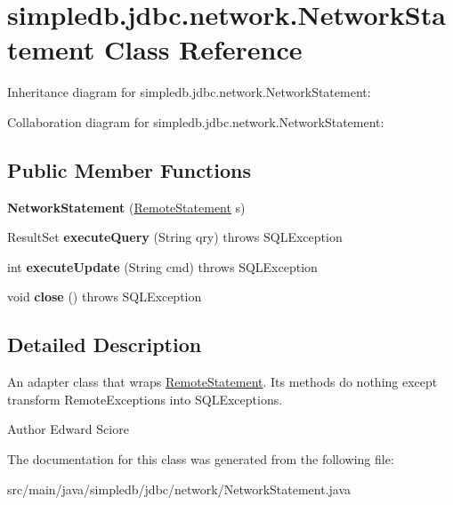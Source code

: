 \hypertarget{classsimpledb_1_1jdbc_1_1network_1_1NetworkStatement}{}\section{simpledb.\+jdbc.\+network.\+Network\+Statement Class Reference}
\label{classsimpledb_1_1jdbc_1_1network_1_1NetworkStatement}


Inheritance diagram for simpledb.\+jdbc.\+network.\+Network\+Statement\+:


Collaboration diagram for simpledb.\+jdbc.\+network.\+Network\+Statement\+:
\subsection*{Public Member Functions}
\begin{DoxyCompactItemize}
\item 
\mbox{\label{classsimpledb_1_1jdbc_1_1network_1_1NetworkStatement_a5f013d87d29e9e58db823477d6c05beb}} 
{\bfseries Network\+Statement} (\hyperlink{interfacesimpledb_1_1jdbc_1_1network_1_1RemoteStatement}{Remote\+Statement} s)
\item 
\mbox{\label{classsimpledb_1_1jdbc_1_1network_1_1NetworkStatement_a5e41fabf1c8be4660908e302abfea355}} 
Result\+Set {\bfseries execute\+Query} (String qry)  throws S\+Q\+L\+Exception 
\item 
\mbox{\label{classsimpledb_1_1jdbc_1_1network_1_1NetworkStatement_a597e47eb5a2d3189c63ea845c3e1c74b}} 
int {\bfseries execute\+Update} (String cmd)  throws S\+Q\+L\+Exception 
\item 
\mbox{\label{classsimpledb_1_1jdbc_1_1network_1_1NetworkStatement_a86870bd8b41a5a9406085adf0e188d33}} 
void {\bfseries close} ()  throws S\+Q\+L\+Exception 
\end{DoxyCompactItemize}


\subsection{Detailed Description}
An adapter class that wraps \hyperlink{interfacesimpledb_1_1jdbc_1_1network_1_1RemoteStatement}{Remote\+Statement}. Its methods do nothing except transform Remote\+Exceptions into S\+Q\+L\+Exceptions. \begin{DoxyAuthor}{Author}
Edward Sciore 
\end{DoxyAuthor}


The documentation for this class was generated from the following file\+:\begin{DoxyCompactItemize}
\item 
src/main/java/simpledb/jdbc/network/Network\+Statement.\+java\end{DoxyCompactItemize}

